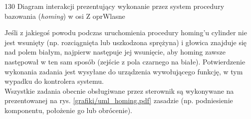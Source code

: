 	{130}
	{Diagram interakcji prezentujący wykonanie przez system procedury bazowania ({\it homing}) w osi Z}
	{oprWlasne}

Jeśli z jakiegoś powodu podczas uruchomienia procedury homing'u cylinder nie jest wsunięty (np. rozciągnięta lub uszkodzona sprężyna) i głowica znajduje się nad polem białym, najpierw następuje jej wsunięcie, aby homing zawsze następował \linebreak w ten sam sposób (zejście z pola czarnego na białe). Potwierdzenie wykonania zadania jest wysyłane do urządzenia wywołującego funkcję, w tym wypadku do kontrolera systemu. \\

Wszystkie zadania obecnie obsługiwane przez sterownik są wykonywane na prezentowanej na rys. \ref{grafiki/uml_homing.pdf} zasadzie (np. podniesienie komponentu, położenie go lub obrócenie). 




